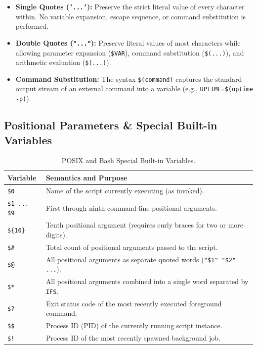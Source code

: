 \begin{itemize}[leftmargin=1.5em]
    \item \textbf{Single Quotes (\texttt{'...'}):} Preserve the strict literal value of every character within. No variable expansion, escape sequence, or command substitution is performed.
    \item \textbf{Double Quotes (\texttt{"..."}):} Preserve literal values of most characters while allowing parameter expansion (\texttt{\$VAR}), command substitution (\texttt{\$(...)}), and arithmetic evaluation (\texttt{\$(...)}).
    \item \textbf{Command Substitution:} The syntax \texttt{\$(command)} captures the standard output stream of an external command into a variable (e.g., \texttt{UPTIME=\$(uptime -p)}).
\end{itemize}

\subsection{Positional Parameters \& Special Built-in Variables}
\begin{table}[htbp]
\centering
\small
\begin{tabularx}{\linewidth}{l X}
\toprule
\textbf{Variable} & \textbf{Semantics and Purpose} \\
\midrule
\texttt{\$0} & Name of the script currently executing (as invoked). \\
\texttt{\$1 ... \$9} & First through ninth command-line positional arguments. \\
\texttt{\$\{10\}} & Tenth positional argument (requires curly braces for two or more digits). \\
\texttt{\$\#} & Total count of positional arguments passed to the script. \\
\texttt{\$@} & All positional arguments as separate quoted words (\texttt{"\$1" "\$2" ...}). \\
\texttt{\$*} & All positional arguments combined into a single word separated by \texttt{IFS}. \\
\texttt{\$?} & Exit status code of the most recently executed foreground command. \\
\texttt{\$\$} & Process ID (PID) of the currently running script instance. \\
\texttt{\$!} & Process ID of the most recently spawned background job. \\
\bottomrule
\end{tabularx}
\caption{POSIX and Bash Special Built-in Variables.}
\label{tab:special-vars}
\end{table}

